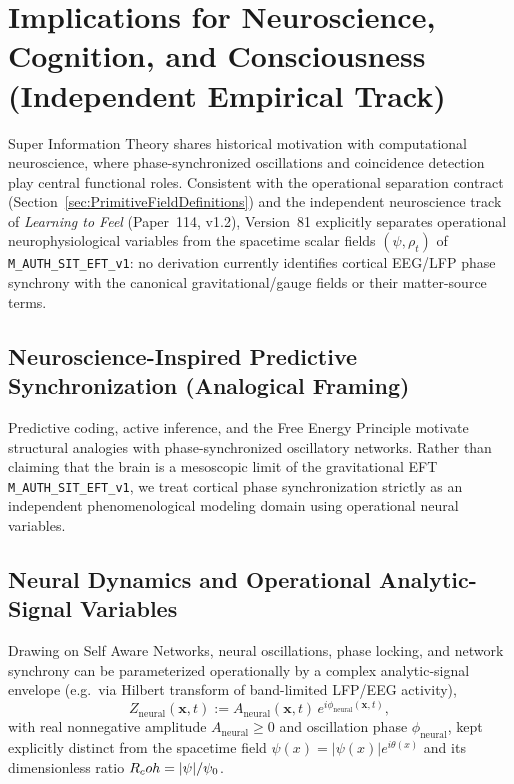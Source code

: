 \section{Implications for Neuroscience, Cognition, and Consciousness (Independent Empirical Track)}
\label{sec:neuroscience-implications}
\label{sec:neuroscience-cognition-implications}

Super Information Theory shares historical motivation with computational neuroscience, where phase-synchronized oscillations and coincidence detection play central functional roles. Consistent with the operational separation contract (Section~\ref{sec:PrimitiveFieldDefinitions}) and the independent neuroscience track of \emph{Learning to Feel} (Paper~114, v1.2), Version~81 explicitly separates operational neurophysiological variables from the spacetime scalar fields $(\psi, \rho_t)$ of \texttt{M\_AUTH\_SIT\_EFT\_v1}: no derivation currently identifies cortical EEG/LFP phase synchrony with the canonical gravitational/gauge fields or their matter-source terms.

\subsection{Neuroscience-Inspired Predictive Synchronization (Analogical Framing)}

Predictive coding, active inference, and the Free Energy Principle motivate structural analogies with phase-synchronized oscillatory networks. Rather than claiming that the brain is a mesoscopic limit of the gravitational EFT \texttt{M\_AUTH\_SIT\_EFT\_v1}, we treat cortical phase synchronization strictly as an independent phenomenological modeling domain using operational neural variables.

\subsection{Neural Dynamics and Operational Analytic-Signal Variables}

Drawing on Self Aware Networks, neural oscillations, phase locking, and network synchrony can be parameterized operationally by a complex analytic-signal envelope (e.g.\ via Hilbert transform of band-limited LFP/EEG activity),
\begin{equation}
Z_{\mathrm{neural}}(\mathbf{x}, t) := A_{\mathrm{neural}}(\mathbf{x}, t)\,e^{i\phi_{\mathrm{neural}}(\mathbf{x}, t)},
\label{eq:neural_analytic_signal}
\end{equation}
with real nonnegative amplitude $A_{\mathrm{neural}} \ge 0$ and oscillation phase $\phi_{\mathrm{neural}}$, kept explicitly distinct from the spacetime field $\psi(x) = |\psi(x)|e^{i\theta(x)}$ and its dimensionless ratio $R_coh = |\psi|/\psi_0$.

